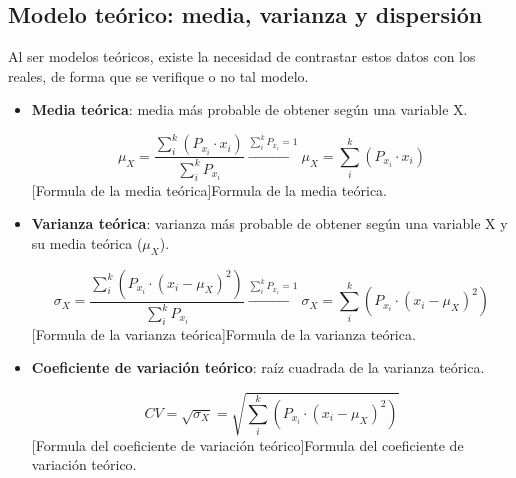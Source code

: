 \subsection{Modelo teórico: media, varianza y dispersión}
Al ser modelos teóricos, existe la necesidad de contrastar estos datos con los reales, de forma que se verifique o no tal modelo.
\begin{itemize}[itemsep=0pt,parsep=0pt,topsep=0pt,partopsep=0pt]
    \item \textbf{Media teórica}: media más probable de obtener según una variable X.
    \begin{center}
        \begin{equation}
            \mu_X = \dfrac{\sum_{i}^{k}\left( P_{x_i}\cdot x_i\right) }{\sum_{i}^{k}P_{x_i}} \xrightarrow[]{\sum_{i}^{k}P_{x_i} = 1} \mu_X = \sum_{i}^{k} \left( P_{x_i}\cdot x_i\right) 
        \end{equation}
        [Formula de la media teórica]{Formula de la media teórica.}
    \end{center}
    \item \textbf{Varianza teórica}: varianza más probable de obtener según una variable X y su media teórica ($\mu_X$).
    \begin{center}
        \begin{equation}
            \sigma_X = \dfrac{\sum_{i}^{k}\left( P_{x_i}\cdot \left( x_i - \mu_X\right)^2\right)  }{\sum_{i}^{k}P_{x_i}} \xrightarrow[]{\sum_{i}^{k}P_{x_i} = 1} \sigma_X = \sum_{i}^{k} \left( P_{x_i}\cdot \left( x_i - \mu_X\right)^2\right) 
        \end{equation}
        [Formula de la varianza teórica]{Formula de la varianza teórica.}
    \end{center}
    \item\textbf{Coeficiente de variación teórico}: raíz cuadrada de la varianza teórica.
    \begin{center}
        \begin{equation}
            CV = \sqrt{\sigma_X} = \sqrt{\sum_{i}^{k} \left( P_{x_i}\cdot \left( x_i - \mu_X\right)^2\right) }
        \end{equation}
        [Formula del coeficiente de variación teórico]{Formula del coeficiente de variación teórico.}
    \end{center}
\end{itemize}
